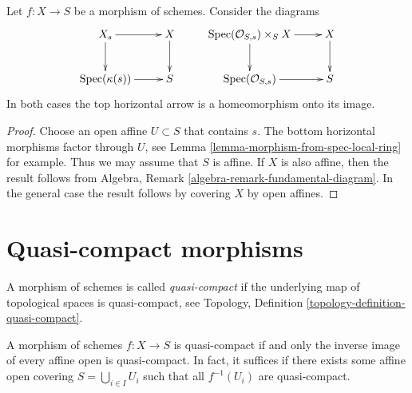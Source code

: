 \begin{lemma}
\label{lemma-fibre-topological}
Let $f : X \to S$ be a morphism of schemes.
Consider the diagrams
$$
\xymatrix{
X_s \ar[r] \ar[d] &
X \ar[d] &
\text{Spec}(\mathcal{O}_{S, s}) \times_S X \ar[r] \ar[d] &
X \ar[d]
\\
\text{Spec}(\kappa(s)) \ar[r] &
S &
\text{Spec}(\mathcal{O}_{S, s}) \ar[r] &
S
}
$$
In both cases the top horizontal arrow is a homeomorphism
onto its image.
\end{lemma}

\begin{proof}
Choose an open affine $U \subset S$ that contains $s$.
The bottom horizontal morphisms factor through $U$, see
Lemma \ref{lemma-morphism-from-spec-local-ring} for example.
Thus we may assume that $S$ is affine. If $X$ is also affine, then
the result follows from
Algebra, Remark \ref{algebra-remark-fundamental-diagram}.
In the general case the result follows by covering $X$ by open affines.
\end{proof}







\section{Quasi-compact morphisms}
\label{section-quasi-compact}

\begin{definition}
\label{definition-quasi-compact}
A morphism of schemes is called {\it quasi-compact}
if the underlying map of topological spaces is
quasi-compact, see
Topology, Definition \ref{topology-definition-quasi-compact}.
\end{definition}

\begin{lemma}
\label{lemma-quasi-compact-affine}
A morphism of schemes $f : X \to S$ is quasi-compact if and
only the inverse image of every affine open is quasi-compact.
In fact, it suffices if there exists some affine open covering
$S = \bigcup_{i \in I} U_i$ such that all $f^{-1}(U_i)$ are quasi-compact.
\end{lemma}

